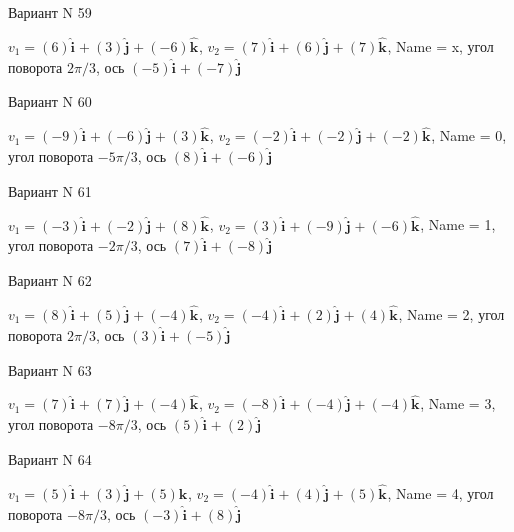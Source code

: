\documentclass[11pt]{report}
\begin{document}
Вариант N 59

$v_1 = \left(6\right)\mathbf{\hat{i}_{}} + \left(3\right)\mathbf{\hat{j}_{}} + \left(-6\right)\mathbf{\hat{k}_{}}$, $v_2 = \left(7\right)\mathbf{\hat{i}_{}} + \left(6\right)\mathbf{\hat{j}_{}} + \left(7\right)\mathbf{\hat{k}_{}}$, Name = x, угол поворота $2 \pi / 3$, ось $\left(-5\right)\mathbf{\hat{i}_{}} + \left(-7\right)\mathbf{\hat{j}_{}}$

Вариант N 60

$v_1 = \left(-9\right)\mathbf{\hat{i}_{}} + \left(-6\right)\mathbf{\hat{j}_{}} + \left(3\right)\mathbf{\hat{k}_{}}$, $v_2 = \left(-2\right)\mathbf{\hat{i}_{}} + \left(-2\right)\mathbf{\hat{j}_{}} + \left(-2\right)\mathbf{\hat{k}_{}}$, Name = 0, угол поворота $- 5 \pi / 3$, ось $\left(8\right)\mathbf{\hat{i}_{}} + \left(-6\right)\mathbf{\hat{j}_{}}$

Вариант N 61

$v_1 = \left(-3\right)\mathbf{\hat{i}_{}} + \left(-2\right)\mathbf{\hat{j}_{}} + \left(8\right)\mathbf{\hat{k}_{}}$, $v_2 = \left(3\right)\mathbf{\hat{i}_{}} + \left(-9\right)\mathbf{\hat{j}_{}} + \left(-6\right)\mathbf{\hat{k}_{}}$, Name = 1, угол поворота $- 2 \pi / 3$, ось $\left(7\right)\mathbf{\hat{i}_{}} + \left(-8\right)\mathbf{\hat{j}_{}}$

Вариант N 62

$v_1 = \left(8\right)\mathbf{\hat{i}_{}} + \left(5\right)\mathbf{\hat{j}_{}} + \left(-4\right)\mathbf{\hat{k}_{}}$, $v_2 = \left(-4\right)\mathbf{\hat{i}_{}} + \left(2\right)\mathbf{\hat{j}_{}} + \left(4\right)\mathbf{\hat{k}_{}}$, Name = 2, угол поворота $2 \pi / 3$, ось $\left(3\right)\mathbf{\hat{i}_{}} + \left(-5\right)\mathbf{\hat{j}_{}}$

Вариант N 63

$v_1 = \left(7\right)\mathbf{\hat{i}_{}} + \left(7\right)\mathbf{\hat{j}_{}} + \left(-4\right)\mathbf{\hat{k}_{}}$, $v_2 = \left(-8\right)\mathbf{\hat{i}_{}} + \left(-4\right)\mathbf{\hat{j}_{}} + \left(-4\right)\mathbf{\hat{k}_{}}$, Name = 3, угол поворота $- 8 \pi / 3$, ось $\left(5\right)\mathbf{\hat{i}_{}} + \left(2\right)\mathbf{\hat{j}_{}}$

Вариант N 64

$v_1 = \left(5\right)\mathbf{\hat{i}_{}} + \left(3\right)\mathbf{\hat{j}_{}} + \left(5\right)\mathbf{\hat{k}_{}}$, $v_2 = \left(-4\right)\mathbf{\hat{i}_{}} + \left(4\right)\mathbf{\hat{j}_{}} + \left(5\right)\mathbf{\hat{k}_{}}$, Name = 4, угол поворота $- 8 \pi / 3$, ось $\left(-3\right)\mathbf{\hat{i}_{}} + \left(8\right)\mathbf{\hat{j}_{}}$
\end{document}
